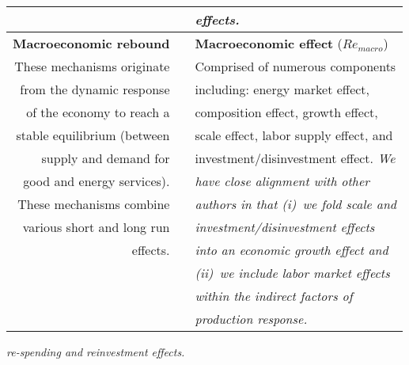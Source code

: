 \begin{table}
\begin{center}
\begin{tabular}{ r l l }
                                   &                                              & \emph{effects.}     \\ 
\midrule
\textbf{Macroeconomic rebound}     &                                             & \textbf{Macroeconomic effect} ($Re_{macro}$) \\
These mechanisms originate         &                                             & Comprised of numerous components \\
from the dynamic response          &                                             & including: energy market effect, \\
of the economy to reach a          &                                             & composition effect, growth effect, \\
stable equilibrium (between        &                                             & scale effect, labor supply effect, and \\
supply and demand for              &                                             & investment/disinvestment effect. \emph{We} \\
good and energy services).         &                                             & \emph{have close alignment with other} \\
These mechanisms combine           &                                             & \emph{authors in that (i)~we fold scale and} \\
various short and long run         &                                             & \emph{investment/disinvestment effects} \\
effects.                           &                                             & \emph{into an economic growth effect and} \\
                                   &                                             & \emph{(ii)~we include labor market effects } \\ 
                                   &                                             & \emph{within the indirect factors of } \\
                                   &                                             & \emph{production response.} \\
\bottomrule
\end{tabular}
\end{center}
\end{table}



\emph{re-spending and reinvestment effects.}